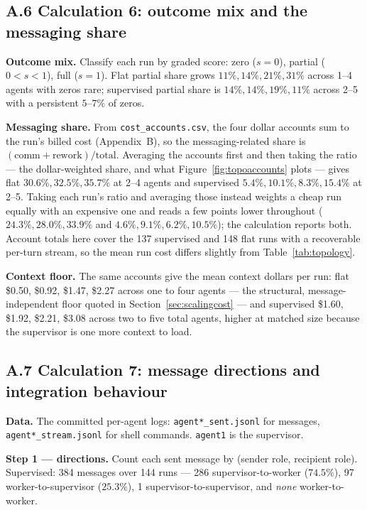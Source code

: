 \documentclass[11pt,a4paper]{article}
\begin{document}
\subsection*{A.6 \quad Calculation 6: outcome mix and the messaging share}

\textbf{Outcome mix.} Classify each run by graded score: zero ($s = 0$), partial ($0 < s < 1$), full ($s = 1$). Flat partial share grows $11\%, 14\%, 21\%, 31\%$ across 1--4 agents with zeros rare; supervised partial share is $14\%, 14\%, 19\%, 11\%$ across 2--5 with a persistent $5$--$7\%$ of zeros.

\textbf{Messaging share.} From \texttt{cost\_accounts.csv}, the four dollar accounts sum to the run's billed cost (Appendix~B), so the messaging-related share is $(\text{comm} + \text{rework}) / \text{total}$. Averaging the accounts first and then taking the ratio --- the dollar-weighted share, and what Figure~\ref{fig:topoaccounts} plots --- gives flat $30.6\%, 32.5\%, 35.7\%$ at 2--4 agents and supervised $5.4\%, 10.1\%, 8.3\%, 15.4\%$ at 2--5. Taking each run's ratio and averaging those instead weights a cheap run equally with an expensive one and reads a few points lower throughout ($24.3\%, 28.0\%, 33.9\%$ and $4.6\%, 9.1\%, 6.2\%, 10.5\%$); the calculation reports both. Account totals here cover the 137 supervised and 148 flat runs with a recoverable per-turn stream, so the mean run cost differs slightly from Table~\ref{tab:topology}.

\textbf{Context floor.} The same accounts give the mean context dollars per run: flat \$0.50, \$0.92, \$1.47, \$2.27 across one to four agents --- the structural, message-independent floor quoted in Section~\ref{sec:scalingcost} --- and supervised \$1.60, \$1.92, \$2.21, \$3.08 across two to five total agents, higher at matched size because the supervisor is one more context to load.

\subsection*{A.7 \quad Calculation 7: message directions and integration behaviour}

\textbf{Data.} The committed per-agent logs: \texttt{agent*\_sent.jsonl} for messages, \texttt{agent*\_stream.jsonl} for shell commands. \texttt{agent1} is the supervisor.

\textbf{Step 1 --- directions.} Count each sent message by (sender role, recipient role). Supervised: 384 messages over 144 runs --- 286 supervisor-to-worker ($74.5\%$), 97 worker-to-supervisor ($25.3\%$), 1 supervisor-to-supervisor, and \emph{none} worker-to-worker.
\end{document}
